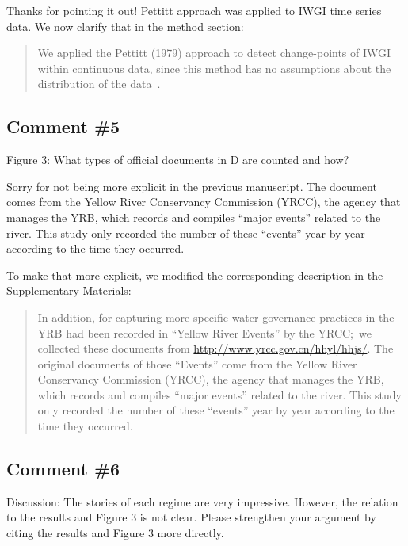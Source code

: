 \AR{} Thanks for pointing it out! Pettitt approach was applied to IWGI time series data. We now clarify that in the method section:

\begin{quote}
    We applied the Pettitt (1979) approach to detect change-points of IWGI within continuous data, since this method has no assumptions about the distribution of the data~\cite{pettitt1979}.
\end{quote}

\subsection{Comment \#5}
\RC{} Figure 3: What types of official documents in D are counted and how?

\AR{} Sorry for not being more explicit in the previous manuscript. The document comes from the Yellow River Conservancy Commission (YRCC), the agency that manages the YRB, which records and compiles ``major events'' related to the river. This study only recorded the number of these ``events'' year by year according to the time they occurred.

\AR*{} To make that more explicit, we modified the corresponding description in the Supplementary Materials:

\begin{quote}
    In addition, for capturing more specific water governance practices in the YRB had been recorded in ``Yellow River Events'' by the YRCC;\ we collected these documents from \url{http://www.yrcc.gov.cn/hhyl/hhjs/}.
    The original documents of those ``Events'' come from the Yellow River Conservancy Commission (YRCC), the agency that manages the YRB, which records and compiles ``major events'' related to the river. This study only recorded the number of these ``events'' year by year according to the time they occurred.
\end{quote}

\subsection{Comment \#6}
\RC{} Discussion: The stories of each regime are very impressive. However, the relation to the results and Figure 3 is not clear. Please strengthen your argument by citing the results and Figure 3 more directly.

